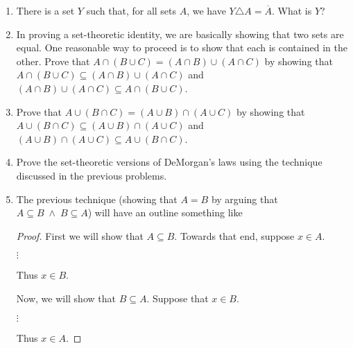 \begin{enumerate}
\item There is a set $Y$ such that, for all sets $A$, we have 
$Y \triangle A = \overline{A}$.  What is $Y$?


\item In proving a set-theoretic identity, we are basically showing that
two sets are equal.  One reasonable way to proceed is to show that
each is contained in the other.  Prove that 
$A \cap (B \cup C) = (A \cap B) \cup (A \cap C)$ by showing that 
$A \cap (B \cup C) \subseteq (A \cap B) \cup (A \cap C)$ and 
$(A \cap B) \cup (A \cap C) \subseteq A \cap (B \cup C)$.

\item Prove that 
$A \cup (B \cap C) = (A \cup B) \cap (A \cup C)$ by showing that 
$A \cup (B \cap C) \subseteq (A \cup B) \cap (A \cup C)$ and 
$(A \cup B) \cap (A \cup C) \subseteq A \cup (B \cap C)$.

 
\item Prove the set-theoretic versions of DeMorgan's laws using the technique
discussed in the previous problems.

\item The previous technique (showing that $A=B$ by arguing that
$A \subseteq B \; \land \; B \subseteq A$) will have an outline something like

\begin{proof} 
First we will show that $A \subseteq B$.\newline
Towards that end, suppose $x \in A$.

\begin{center}
$\vdots$
\end{center}

Thus $x \in B$.

Now, we will show that $B \subseteq A$. \newline
Suppose that $x \in B$.

\begin{center}
$\vdots$
\end{center}

Thus $x \in A$.


\end{proof}
\end{enumerate}
